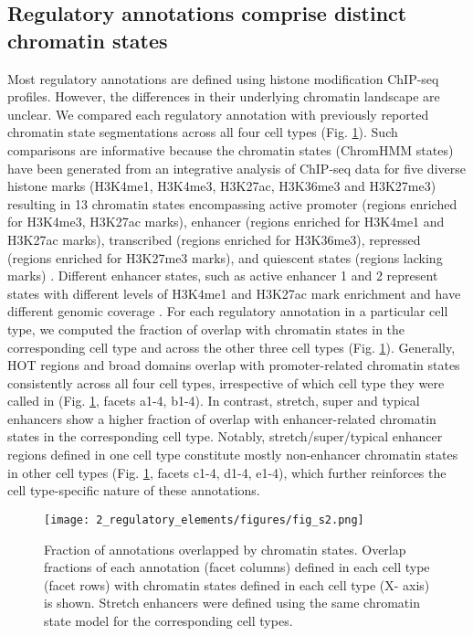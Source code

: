 \subsection{Regulatory annotations comprise distinct chromatin states}
Most regulatory annotations are defined using histone modification ChIP-seq profiles. However, the differences in their underlying chromatin landscape are unclear. We compared each regulatory annotation with previously reported chromatin state segmentations across all four cell types \cite{varshneyGeneticRegulatorySignatures2017} (Fig. \ref{fig:c1_fs2}). Such comparisons are informative because the chromatin states (ChromHMM states) have been generated from an integrative analysis of ChIP-seq data for five diverse histone marks (H3K4me1, H3K4me3, H3K27ac, H3K36me3 and H3K27me3) resulting in 13 chromatin states encompassing active promoter (regions enriched for H3K4me3, H3K27ac marks), enhancer (regions enriched for H3K4me1 and H3K27ac marks), transcribed (regions enriched for H3K36me3), repressed (regions enriched for H3K27me3 marks), and quiescent states (regions lacking marks) \cite{varshneyGeneticRegulatorySignatures2017}. Different enhancer states, such as active enhancer 1 and 2 represent states with different levels of H3K4me1 and H3K27ac mark enrichment and have different genomic coverage \cite{varshneyGeneticRegulatorySignatures2017}. For each regulatory annotation in a particular cell type, we computed the fraction of overlap with chromatin states in the corresponding cell type and across the other three cell types (Fig. \ref{fig:c1_fs2}). Generally, HOT regions and broad domains overlap with promoter-related chromatin states consistently across all four cell types, irrespective of which cell type they were called in (Fig. \ref{fig:c1_fs2}, facets a1-4, b1-4). In contrast, stretch, super and typical enhancers show a higher fraction of overlap with enhancer-related chromatin states in the corresponding cell type. Notably, stretch/super/typical enhancer regions defined in one cell type constitute mostly non-enhancer chromatin states in other cell types (Fig. \ref{fig:c1_fs2}, facets c1-4, d1-4, e1-4), which further reinforces the cell type-specific nature of these annotations. \\

\begin{figure}
    \centering
    \texttt{[image: 2\_regulatory\_elements/figures/fig\_s2.png]}
    \caption[Fraction of annotations overlapped by chromatin states]{Fraction of annotations overlapped by chromatin states. Overlap fractions of each annotation (facet columns) defined in each cell type (facet rows) with chromatin states defined in each cell type (X- axis) is shown. Stretch enhancers were defined using the same chromatin state model for the corresponding cell types.}
    \label{fig:c1_fs2}
\end{figure}

